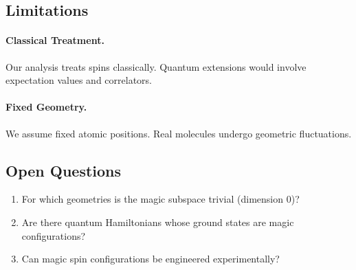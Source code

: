 \subsection{Limitations}

\paragraph{Classical Treatment.} Our analysis treats spins classically. Quantum extensions would involve expectation values and correlators.

\paragraph{Fixed Geometry.} We assume fixed atomic positions. Real molecules undergo geometric fluctuations.

\subsection{Open Questions}

\begin{enumerate}
    \item For which geometries is the magic subspace trivial (dimension 0)?
    \item Are there quantum Hamiltonians whose ground states are magic configurations?
    \item Can magic spin configurations be engineered experimentally?
\end{enumerate}
